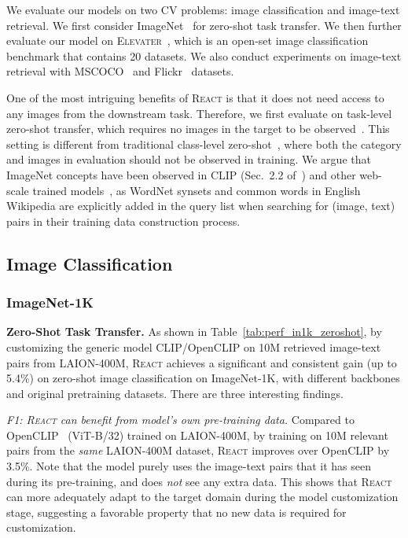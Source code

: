 \documentclass[10pt,twocolumn,letterpaper]{article}
\renewcommand{\paragraph}[1]{\vspace{1.25mm}\noindent\textbf{#1}}
\newcommand{\shortname}{\textsc{React}}
\begin{document}
We evaluate our models on two CV problems: image classification and image-text retrieval. We first consider ImageNet~\cite{deng2009imagenet} for zero-shot task transfer.  We then further evaluate our model on \textsc{Elevater}~\cite{li2022elevater}, which is an open-set image classification benchmark that contains 20 datasets.  We also conduct experiments on image-text retrieval with MSCOCO~\cite{lin2014microsoft} and Flickr~\cite{young2014image} datasets.

One of the most intriguing benefits of \shortname{} is that it does not need access to any images from the downstream task.  Therefore, we first evaluate on task-level zero-shot transfer, which requires no images in the target to be observed~\cite{radford2021learning,shen2022klite,li2022elevater}. This setting is different from traditional class-level zero-shot~\cite{xian2018zero}, where both the category and images in evaluation should not be observed in training. We argue that ImageNet concepts have been observed in CLIP (Sec.~2.2 of~\cite{radford2021learning}) and other web-scale trained models~\cite{li2021supervision}, as WordNet synsets and common words in English Wikipedia are explicitly added in the query list when searching for (image, text) pairs in their training data construction process.

\vspace{-1mm}
\subsection{Image Classification}
\vspace{-1mm}
\subsubsection{ImageNet-1K}
\vspace{-1mm}

\paragraph{Zero-Shot Task Transfer.}
As shown in Table~\ref{tab:perf_in1k_zeroshot}, by customizing the generic model CLIP/OpenCLIP on 10M retrieved image-text pairs from LAION-400M, \shortname{} achieves a significant and consistent gain (up to 5.4\%) on zero-shot image classification on ImageNet-1K, with different backbones and original pretraining datasets.  There are three interesting findings.

{\it F1: \shortname{} can benefit from model's own pre-training data.}
Compared to OpenCLIP~\cite{openclip} (ViT-B/32) trained on LAION-400M, by training on 10M relevant pairs from the \emph{same} LAION-400M dataset, \shortname{} improves over OpenCLIP by 3.5\%.  Note that the model purely uses the image-text pairs that it has seen during its pre-training, and does \emph{not} see any extra data.  This shows that \shortname{} can more adequately adapt to the target domain during the model customization stage, suggesting a favorable property that no new data is required for customization.
\end{document}
